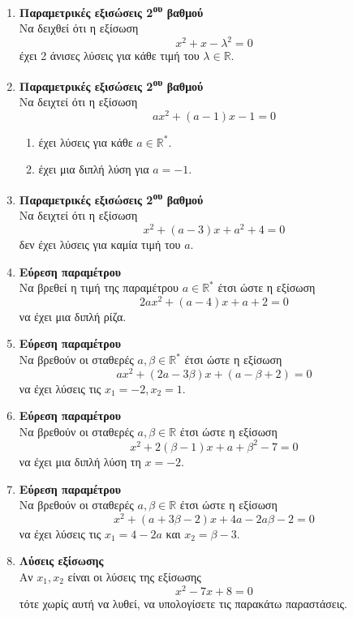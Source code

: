 \documentclass[twoside,nofonts,internet]{askhseis}
\newcommand{\tss}[1]{\textsuperscript{#1}}
\begin{document}
\begin{enumerate}
\item \textbf{Παραμετρικές εξισώσεις 2\tss{ου} βαθμού}\\
Να δειχθεί ότι η εξίσωση
\[ x^2+x-\lambda^2=0 \]
έχει 2 άνισες λύσεις για κάθε τιμή του $ \lambda\in\mathbb{R} $.
\item \textbf{Παραμετρικές εξισώσεις 2\tss{ου} βαθμού}\\
Να δειχτεί ότι η εξίσωση
\[ ax^2+(a-1)x-1=0 \]
\begin{enumerate}[label=\roman*.]
\item έχει λύσεις για κάθε $ a\in\mathbb{R}^* $.
\item έχει μια διπλή λύση για $ a=-1 $.
\end{enumerate}
\item \textbf{Παραμετρικές εξισώσεις 2\tss{ου} βαθμού}\\
Να δειχτεί ότι η εξίσωση
\[ x^2+(a-3) x+a^2+4=0 \]
δεν έχει λύσεις για καμία τιμή του $ a $.
\item \textbf{Εύρεση παραμέτρου}\\
Να βρεθεί η τιμή της παραμέτρου $ a\in\mathbb{R}^* $ έτσι ώστε η εξίσωση
\[ 2ax^2+(a-4)x+a+2=0 \]
να έχει μια διπλή ρίζα.
\item \textbf{Εύρεση παραμέτρου}\\
Να βρεθούν οι σταθερές $ a,\beta\in\mathbb{R}^* $ έτσι ώστε η εξίσωση
\[ ax^2+(2a-3\beta)x+(a-\beta+2)=0 \] 
να έχει λύσεις τις $ x_1=-2, x_2=1 $.
\item \textbf{Εύρεση παραμέτρου}\\
Να βρεθούν οι σταθερές $ a, \beta\in\mathbb{R} $ έτσι ώστε η εξίσωση
 \[ x^2+2(\beta-1)x+a+\beta^2-7=0 \] 
 να έχει μια διπλή λύση τη $ x=-2$.
\item \textbf{Εύρεση παραμέτρου}\\
Να βρεθούν οι σταθερές $ a, \beta\in\mathbb{R} $ έτσι ώστε η εξίσωση
 \[ x^2+(a+3\beta-2)x+4a-2a\beta-2=0 \]
να έχει λύσεις τις $ x_1=4-2a $ και $ x_2=\beta-3 $.
\item \textbf{Λύσεις εξίσωσης}\\
Αν $ x_1,x_2 $ είναι οι λύσεις της εξίσωσης
\[ x^2-7x+8=0 \]
τότε χωρίς αυτή να λυθεί, να υπολογίσετε τις παρακάτω παραστάσεις.
\begin{multicols}{2}
\end{multicols}
\end{enumerate}
\end{document}
